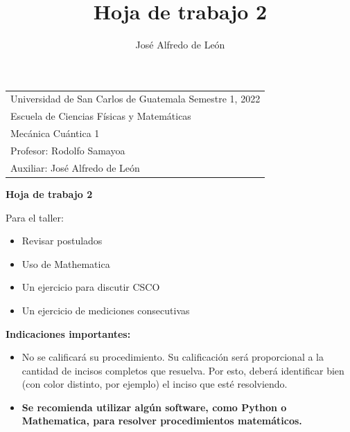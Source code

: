 \documentclass[11pt,letterpaper]{article}
\author{José Alfredo de León}
\title{Hoja de trabajo 2 \hspace{\fill}}
\begin{document}
\noindent
{}
\hspace{23mm}
\begin{tabular}{p{149mm}}
Universidad de San Carlos de Guatemala \hspace*{\fill} Semestre 1, 2022 \\
Escuela de Ciencias Físicas y Matemáticas  \\
Mecánica Cuántica 1            \\
Profesor: Rodolfo Samayoa      \\
Auxiliar: José Alfredo de León \\
\end{tabular}

\begin{center}
\bf\Large Hoja de trabajo 2
\end{center}

\noindent
\textcolor{jacolor}{
Para el taller: 
\begin{itemize}
\item Revisar postulados
\item Uso de Mathematica
\item Un ejercicio para discutir CSCO
\item Un ejercicio de mediciones consecutivas
\end{itemize}
}

\noindent\textbf{Indicaciones importantes:}
\begin{itemize}
\item No se calificará su procedimiento. Su calificación será proporcional
a la cantidad de incisos completos que resuelva. Por esto, 
deberá identificar bien (con color distinto, por ejemplo) el inciso que 
esté resolviendo.
\item 
\textbf{Se recomienda utilizar algún software, como Python
o Mathematica, para resolver procedimientos matemáticos.}
\end{itemize}
\end{document}
